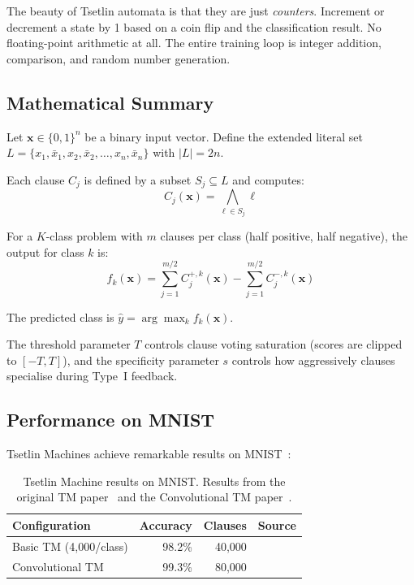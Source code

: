 \begin{engineernote}
The beauty of Tsetlin automata is that they are just
\emph{counters}. Increment or decrement a state by 1 based on a
coin flip and the classification result. No floating-point
arithmetic at all. The entire training loop is integer addition,
comparison, and random number generation.
\end{engineernote}

\subsection{Mathematical Summary}
\label{sec:tm-math}

Let $\bm{x} \in \{0,1\}^n$ be a binary input vector. Define the
extended literal set $L = \{x_1, \bar{x}_1, x_2, \bar{x}_2, \ldots,
x_n, \bar{x}_n\}$ with $|L| = 2n$.

Each clause $C_j$ is defined by a subset $S_j \subseteq L$ and
computes:
\begin{equation}
  C_j(\bm{x}) = \bigwedge_{\ell \in S_j} \ell
  \label{eq:tm-clause-formal}
\end{equation}

For a $K$-class problem with $m$ clauses per class (half positive,
half negative), the output for class $k$ is:
\begin{equation}
  f_k(\bm{x}) = \sum_{j=1}^{m/2} C_j^{+,k}(\bm{x})
    - \sum_{j=1}^{m/2} C_j^{-,k}(\bm{x})
  \label{eq:tm-class-score}
\end{equation}

The predicted class is $\hat{y} = \arg\max_k f_k(\bm{x})$.

The threshold parameter $T$ controls clause voting saturation (scores
are clipped to $[-T, T]$), and the specificity parameter $s$ controls
how aggressively clauses specialise during Type~I feedback.

\subsection{Performance on MNIST}
\label{sec:tm-mnist}

Tsetlin Machines achieve remarkable results on MNIST~\cite{lecun1998mnist}:

\begin{table}[htbp]
\centering
\caption{Tsetlin Machine results on MNIST. Results from the original
  TM paper~\cite{granmo2018tsetlin} and the Convolutional TM
  paper~\cite{granmo2019convtm}.}
\label{tab:tm-mnist}
\begin{tabular}{@{}lrrl@{}}
  \toprule
  \textbf{Configuration}     & \textbf{Accuracy} & \textbf{Clauses} & \textbf{Source} \\
  \midrule
  Basic TM (4{,}000/class)   & 98.2\%            & 40{,}000 & \cite{granmo2018tsetlin} \\
  Convolutional TM            & 99.3\%            & 80{,}000 & \cite{granmo2019convtm} \\
  \bottomrule
\end{tabular}
\end{table}

